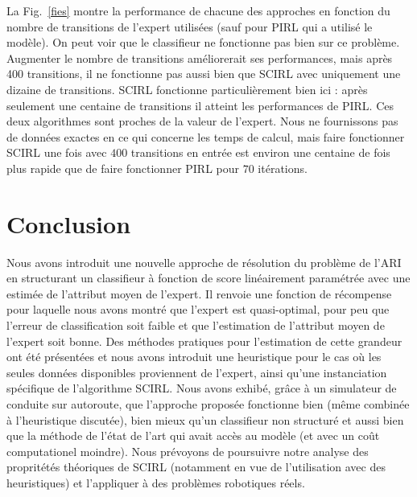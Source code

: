 \documentclass[french,utf8]{./hermes-journal}
\begin{document}
La Fig.~\ref{fies} montre la performance de chacune des approches en fonction du nombre de transitions de l'expert utilisées (sauf pour PIRL qui a utilisé le modèle). On peut voir que le classifieur ne fonctionne pas bien sur ce problème. Augmenter le nombre de transitions améliorerait ses performances, mais après 400 transitions, il ne fonctionne pas aussi bien que SCIRL avec uniquement une dizaine de transitions. SCIRL fonctionne particulièrement bien ici : après seulement une centaine de transitions il atteint les performances de PIRL. Ces deux algorithmes sont proches de la valeur de l'expert. Nous ne fournissons pas de données exactes en ce qui concerne les temps de calcul, mais faire fonctionner SCIRL une fois avec $400$ transitions en entrée est environ une centaine de fois plus rapide que de faire fonctionner PIRL pour $70$ itérations.
%



\section{Conclusion}
\label{seonclusion}

Nous avons introduit une nouvelle approche de résolution du problème de l'ARI en structurant un classifieur à fonction de score linéairement paramétrée avec une estimée de l'attribut moyen de l'expert. Il renvoie une fonction de récompense pour laquelle nous avons montré que l'expert est quasi-optimal, pour peu que l'erreur de classification soit faible et que l'estimation de l'attribut moyen de l'expert soit bonne. Des méthodes pratiques pour l'estimation de cette grandeur ont été présentées et nous avons introduit une heuristique pour le cas où les seules données disponibles proviennent de l'expert, ainsi qu'une instanciation spécifique de l'algorithme SCIRL. Nous avons exhibé, grâce à un simulateur de conduite sur autoroute, que l'approche proposée fonctionne bien (même combinée à l'heuristique discutée), bien mieux qu'un classifieur non structuré et aussi bien que la méthode de l'état de l'art qui avait accès au modèle (et avec un coût computationel moindre). Nous prévoyons de poursuivre notre analyse des propritétés théoriques de SCIRL (notamment en vue de l'utilisation avec des heuristiques) et l'appliquer à des problèmes robotiques réels.


\newpage

\end{document}
